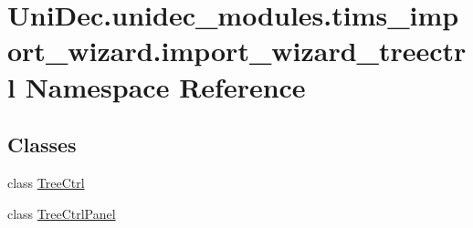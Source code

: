 \hypertarget{namespace_uni_dec_1_1unidec__modules_1_1tims__import__wizard_1_1import__wizard__treectrl}{}\section{Uni\+Dec.\+unidec\+\_\+modules.\+tims\+\_\+import\+\_\+wizard.\+import\+\_\+wizard\+\_\+treectrl Namespace Reference}
\label{namespace_uni_dec_1_1unidec__modules_1_1tims__import__wizard_1_1import__wizard__treectrl}
\subsection*{Classes}
\begin{DoxyCompactItemize}
\item 
class \hyperlink{class_uni_dec_1_1unidec__modules_1_1tims__import__wizard_1_1import__wizard__treectrl_1_1_tree_ctrl}{Tree\+Ctrl}
\item 
class \hyperlink{class_uni_dec_1_1unidec__modules_1_1tims__import__wizard_1_1import__wizard__treectrl_1_1_tree_ctrl_panel}{Tree\+Ctrl\+Panel}
\end{DoxyCompactItemize}
